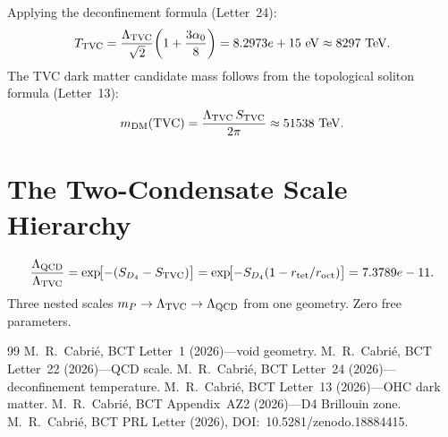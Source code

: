 \documentclass[aps,prl,preprint,superscriptaddress,floatfix]{revtex4-2}
\begin{document}
Applying the deconfinement formula (Letter~24):
\begin{equation}
T_{\rm TVC} = \frac{\Lambda_{\rm TVC}}{\sqrt{2}}\!\left(1+\frac{3\alpha_0}{8}\right)
= 8.2973e+15~\text{eV} \approx 8297~\text{TeV}.
\end{equation}
The TVC dark matter candidate mass follows from the topological soliton formula
(Letter~13):
\begin{equation}
m_{\rm DM}({\rm TVC}) = \frac{\Lambda_{\rm TVC}\,S_{\rm TVC}}{2\pi}
\approx 51538~\text{TeV}.
\end{equation}

\section{The Two-Condensate Scale Hierarchy}

\begin{equation}
\frac{\Lambda_{\rm QCD}}{\Lambda_{\rm TVC}}
= \exp\!\bigl[-(S_{D_4}-S_{\rm TVC})\bigr]
= \exp\!\bigl[-S_{D_4}(1-r_{\rm tet}/r_{\rm oct})\bigr]
= 7.3789e-11.
\end{equation}
Three nested scales $m_P\to\Lambda_{\rm TVC}\to\Lambda_{\rm QCD}$
from one geometry. Zero free parameters.

\begin{thebibliography}{99}
  M.~R.~Cabri\'e, BCT Letter~1 (2026)---void geometry.
 M.~R.~Cabri\'e, BCT Letter~22 (2026)---QCD scale.
 M.~R.~Cabri\'e, BCT Letter~24 (2026)---deconfinement temperature.
 M.~R.~Cabri\'e, BCT Letter~13 (2026)---OHC dark matter.
   M.~R.~Cabri\'e, BCT Appendix~AZ2 (2026)---D4 Brillouin zone.
   M.~R.~Cabri\'e, BCT PRL Letter (2026), DOI:~10.5281/zenodo.18884415.
\end{thebibliography}
\end{document}
